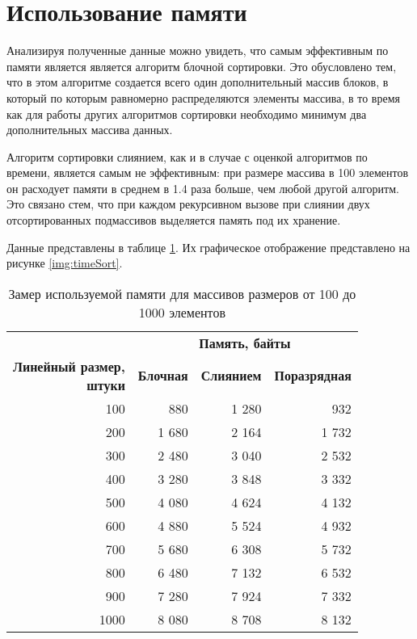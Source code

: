 \clearpage

\section{Использование памяти}

Анализируя полученные данные можно увидеть, что самым эффективным по памяти является является алгоритм блочной сортировки. Это обусловлено тем, что в
этом алгоритме создается всего один дополнительный массив блоков, в который по которым равномерно распределяются элементы массива, в то время как для работы других алгоритмов сортировки необходимо минимум два дополнительных массива данных.

Алгоритм сортировки слиянием, как и в случае с оценкой алгоритмов по времени,
является самым не эффективным: при размере массива в 100 элементов он расходует памяти в среднем в 1.4 раза больше, чем любой другой алгоритм. Это связано стем, что при каждом рекурсивном вызове при слиянии двух отсортированных подмассивов выделяется память под их хранение.

Данные представлены в таблице \ref{tbl:mem}. Их графическое отображение представлено на рисунке \ref{img:timeSort}.

\begin{table}[ht]
	\small
	\begin{center}
		\begin{threeparttable}
			\caption{Замер используемой памяти для массивов размеров от 100 до 1000 элементов}
			\label{tbl:mem}
			\begin{tabular}{|r|r|r|r|}
				\hline
				& \multicolumn{3}{c|}{\bfseries Память, байты} \\ \cline{2-4}
				\bfseries \makecell{Линейный размер, \\ штуки} & \bfseries Блочная & \bfseries Слиянием & \bfseries Поразрядная \\ \cline{2-4}
				\hline
				100 & 880 & 1 280 & 932 \\
				\hline
				200 & 1 680 & 2 164 & 1 732 \\
				\hline
				300 & 2 480 & 3 040 & 2 532 \\
				\hline
				400 & 3 280 & 3 848 & 3 332 \\
				\hline
				500 & 4 080 & 4 624 & 4 132 \\
				\hline
				600 & 4 880 & 5 524 & 4 932 \\
				\hline
				700 & 5 680 & 6 308 & 5 732 \\
				\hline
				800 & 6 480 & 7 132 & 6 532 \\
				\hline
				900 & 7 280 & 7 924 & 7 332 \\
				\hline
				1000 & 8 080 & 8 708 & 8 132 \\
				\hline
			\end{tabular}	
		\end{threeparttable}
	\end{center}
\end{table}

